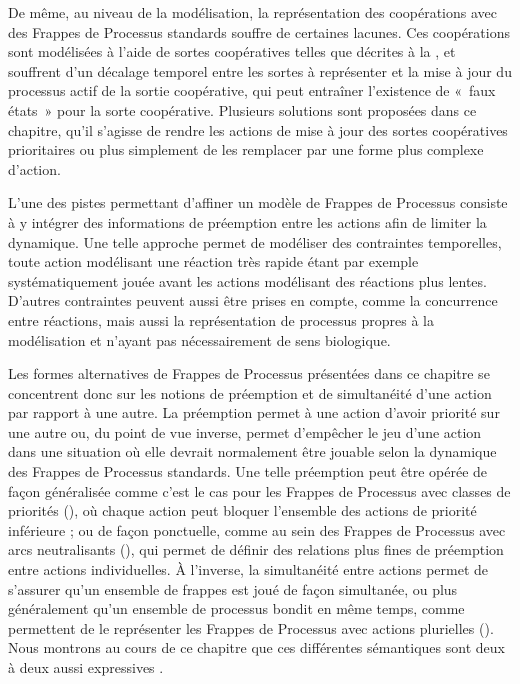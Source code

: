 De même, au niveau de la modélisation, la représentation des coopérations avec des Frappes de
Processus standards souffre de certaines lacunes.
Ces coopérations sont modélisées à l'aide de sortes coopératives telles que décrites à la ,
et souffrent d'un décalage temporel entre les sortes à représenter et
la mise à jour du processus actif de la sortie coopérative,
qui peut entraîner l'existence de «~faux états~» pour la sorte coopérative.
Plusieurs solutions sont proposées dans ce chapitre, qu'il s'agisse de rendre les actions de mise à
jour des sortes coopératives prioritaires ou plus simplement de les remplacer par une forme plus
complexe d'action.

L'une des pistes permettant d'affiner un modèle de Frappes de Processus consiste à y intégrer
des informations de préemption entre les actions afin de limiter la dynamique.
Une telle approche permet de modéliser des contraintes temporelles,
toute action modélisant une réaction très rapide étant par exemple systématiquement jouée
avant les actions modélisant des réactions plus lentes.
D'autres contraintes peuvent aussi être prises en compte, comme la concurrence entre réactions,
mais aussi la représentation de processus propres à la modélisation et n'ayant pas nécessairement
de sens biologique.

Les formes alternatives de Frappes de Processus présentées dans ce chapitre se concentrent donc
sur les notions de préemption et de simultanéité d'une action par rapport à une autre.
La préemption permet à une action d'avoir priorité sur une autre ou, du point de vue inverse,
permet d'empêcher le jeu d'une action dans une situation où elle devrait normalement être jouable
selon la dynamique des Frappes de Processus standards.
Une telle préemption peut être opérée de façon généralisée
comme c'est le cas pour les Frappes de Processus avec classes de priorités (),
où chaque action peut bloquer l'ensemble des actions de priorité inférieure ;
ou de façon ponctuelle, comme au sein des Frappes de Processus avec arcs neutralisants (),
qui permet de définir des relations plus fines de préemption entre actions individuelles.
À l'inverse, la simultanéité entre actions permet de s'assurer qu'un ensemble de frappes est joué
de façon simultanée, ou plus généralement qu'un ensemble de processus bondit en même temps,
comme permettent de le représenter les Frappes de Processus avec actions plurielles ().
Nous montrons au cours de ce chapitre que ces différentes sémantiques sont deux à deux aussi
expressives .

